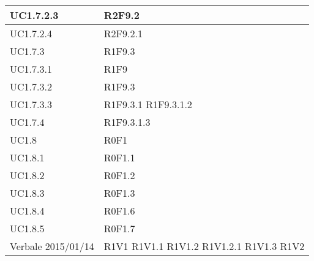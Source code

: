 \begin{center}
\begin{longtable}{| p{4cm} | p{4cm} |}
		\hline
		UC1.7.2.3  &  R2F9.2 \\
		\hline
		UC1.7.2.4  &  R2F9.2.1 \\
		\hline
		UC1.7.3  &  R1F9.3 \\
		\hline
		UC1.7.3.1  &  R1F9 \\
		\hline
		UC1.7.3.2  &  R1F9.3 \\
		\hline
		UC1.7.3.3  &  R1F9.3.1 \newline R1F9.3.1.2 \\
		\hline
		UC1.7.4  &  R1F9.3.1.3 \\
		\hline
		UC1.8  &  R0F1 \\
		\hline
		UC1.8.1  &  R0F1.1 \\
		\hline
		UC1.8.2  &  R0F1.2 \\
		\hline
		UC1.8.3  &  R0F1.3 \\
		\hline
		UC1.8.4  &  R0F1.6 \\
		\hline
		UC1.8.5  &  R0F1.7 \\
		\hline
		Verbale 2015/01/14  &  R1V1 \newline R1V1.1 \newline R1V1.2 \newline R1V1.2.1 \newline R1V1.3 \newline R1V2 \\
		\hline

	\end{longtable}
	\egroup
	\end{center}


